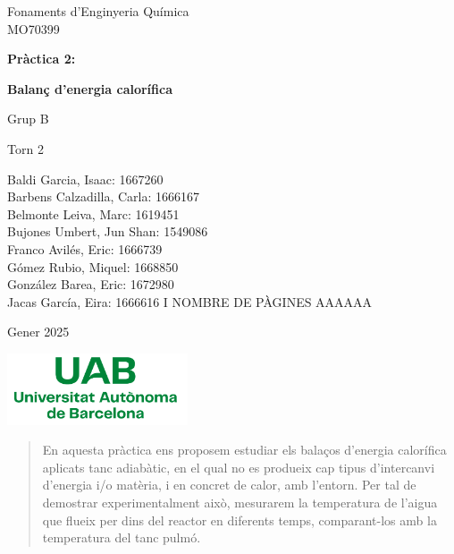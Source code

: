 \documentclass[10pt, twoside]{article}
\begin{document}
\begin{titlepage}
\centering
{\Large Fonaments d'Enginyeria Química \\ MO70399 \par}
\vspace{2cm}
{\Huge \textbf{Pràctica 2:} \par}
\vspace{1cm}
{\Huge \textbf{Balanç d'energia calorífica} \par}
\vspace{2cm}
{\Large Grup B \par}
\vspace{0.5cm}
{\Large Torn 2 \par}
\vspace{0.5cm}
{\normalsize Baldi Garcia, Isaac: 1667260 \\ Barbens Calzadilla, Carla: 1666167 \\ Belmonte Leiva, Marc: 1619451 \\ Bujones Umbert, Jun Shan: 1549086 \\ Franco Avilés, Eric: 1666739 \\ Gómez Rubio, Miquel: 1668850 \\ González Barea, Eric: 1672980 \\ Jacas García, Eira: 1666616 I NOMBRE DE PÀGINES AAAAAA\par}
\vspace{2cm}
{\Large Gener 2025 \par}
\vspace{2cm}
\includegraphics[width=0.4\textwidth]{Logo_UAB.png}


\end{titlepage}

\renewcommand{\cftsecfont}{}
\renewcommand{\cftsecpagefont}{}
\renewcommand{\cftsecleader}{\cftdotfill{\cftdotsep}}
\renewcommand{\cftdotsep}{0.2}
\setlength{\cftbeforesecskip}{0.5em}
\setlength{\cftbeforesubsecskip}{0.5em}
\tableofcontents

\newpage
{}
\setcounter{page}{1}

\pagestyle{fancy}

\begin{abstract}
En aquesta pràctica ens proposem estudiar els balaços d'energia calorífica aplicats tanc adiabàtic, en el qual no es produeix cap tipus d'intercanvi d'energia i/o matèria, i en concret de calor, amb l'entorn.  Per tal de demostrar experimentalment això, mesurarem la temperatura de l'aigua que flueix per dins del reactor en diferents temps, comparant-los amb la temperatura del tanc pulmó.
\end{abstract}
\end{document}
